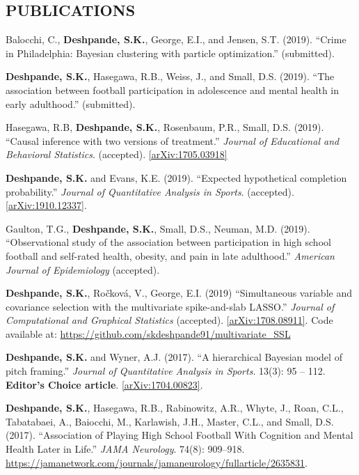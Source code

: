 \documentclass[margin]{res}
\begin{document}
\begin{resume}
\section{PUBLICATIONS}



Balocchi, C., \textbf{Deshpande, S.K.}, George, E.I., and Jensen, S.T. (2019). ``Crime in Philadelphia: Bayesian clustering with particle optimization.'' (submitted).

\textbf{Deshpande, S.K.}, Hasegawa, R.B., Weiss, J., and Small, D.S. (2019). ``The association between football participation in adolescence and mental health in early adulthood.'' (submitted).

Hasegawa, R.B, \textbf{Deshpande, S.K.}, Rosenbaum, P.R., Small, D.S. (2019). ``Causal inference with two versions of treatment.'' \textit{Journal of Educational and Behavioral Statistics}. (accepted). \href{https://arxiv.org/abs/1705.03918}{[arXiv:1705.03918]}

\textbf{Deshpande, S.K.} and Evans, K.E. (2019). ``Expected hypothetical completion probability.'' \textit{Journal of Quantitative Analysis in Sports}. (accepted). \href{https://arxiv.org/abs/1910.12337}{[arXiv:1910.12337]}.

Gaulton, T.G., \textbf{Deshpande, S.K.}, Small, D.S., Neuman, M.D. (2019). ``Observational study of the association between participation in high school football and self-rated health, obesity, and pain in late adulthood.'' \textit{American Journal of Epidemiology} (accepted).

\textbf{Deshpande, S.K.}, Ro\v{c}kov\'{a}, V.,  George, E.I. (2019) ``Simultaneous variable and covariance selection with the multivariate spike-and-slab LASSO.'' \textit{Journal of Computational and Graphical Statistics} (accepted). \href{https://arxiv.org/abs/1708.08911}{[arXiv:1708.08911]}. Code available at: \url{https://github.com/skdeshpande91/multivariate_SSL}

\textbf{Deshpande, S.K.} and Wyner, A.J. (2017). ``A hierarchical Bayesian model of pitch framing.'' \textit{Journal of Quantitative Analysis in Sports}. 13(3): 95 -- 112. \textbf{Editor's Choice article}. \href{https://arxiv.org/abs/1704.00823}{[arXiv:1704.00823]}.

\textbf{Deshpande, S.K.}, Hasegawa, R.B., Rabinowitz, A.R., Whyte, J., Roan, C.L., Tabatabaei, A., Baiocchi, M., Karlawish, J.H., Master, C.L., and Small, D.S. (2017). ``Association of Playing High School Football With Cognition and Mental Health Later in Life.'' \textit{JAMA Neurology}. 74(8): 909--918. \url{https://jamanetwork.com/journals/jamaneurology/fullarticle/2635831}.


\end{resume}
\end{document}
